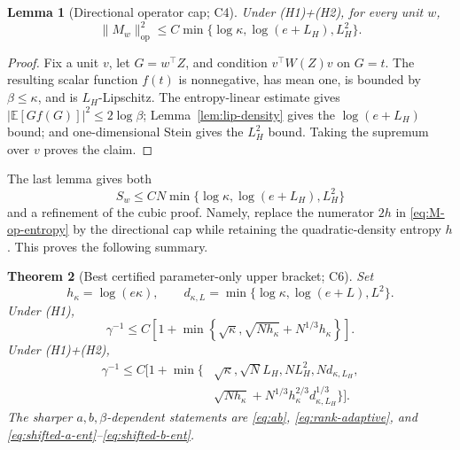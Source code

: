 \documentclass[11pt]{article}
\numberwithin{equation}{section}
\newtheorem{theorem}{Theorem}[section]
\newtheorem{lemma}[theorem]{Lemma}
\newcommand{\E}{\mathbb E}
\newcommand{\op}{\mathrm{op}}
\begin{document}
\begin{lemma}[Directional operator cap; C4]\label{lem:directional-cap}
Under (H1)+(H2), for every unit $w$,
\begin{equation}\label{eq:directional-cap}
 \|M_w\|_{\op}^2\le
 C\min\{\log\kappa,\log(e+L_H),L_H^2\}.
\end{equation}
\end{lemma}

\begin{proof}
Fix a unit $v$, let $G=w^\top Z$, and condition
$v^\top W(Z)v$ on $G=t$.  The resulting scalar function $f(t)$ is
nonnegative, has mean one, is bounded by $\beta\le\kappa$, and is
$L_H$-Lipschitz.  The entropy-linear estimate gives
$|\E[Gf(G)]|^2\le2\log\beta$; Lemma~\ref{lem:lip-density} gives the
$\log(e+L_H)$ bound; and one-dimensional Stein gives the $L_H^2$ bound.
Taking the supremum over $v$ proves the claim.
\end{proof}

The last lemma gives both
\begin{equation}\label{eq:rank-cap}
 S_w\le CN\min\{\log\kappa,\log(e+L_H),L_H^2\}
\end{equation}
and a refinement of the cubic proof.  Namely, replace the numerator
$2h$ in \eqref{eq:M-op-entropy} by the directional cap while retaining the
quadratic-density entropy $h$.  This proves the following summary.

\begin{theorem}[Best certified parameter-only upper bracket; C6]
\label{thm:main-upper}
Set
\begin{equation}\label{eq:h-d0}
 h_\kappa=\log(e\kappa),\qquad
 d_{\kappa,L}=\min\{\log\kappa,\log(e+L),L^2\}.
\end{equation}
Under (H1),
\begin{equation}\label{eq:H1-main-upper}
 \boxed{
 \gamma^{-1}\le C\left[1+\min\left\{\sqrt\kappa,
 \sqrt{Nh_\kappa}+N^{1/3}h_\kappa\right\}\right].}
\end{equation}
Under (H1)+(H2),
\begin{equation}\label{eq:H2-main-upper}
 \boxed{
 \begin{aligned}
 \gamma^{-1}\le C\Big[1+\min\{&\sqrt\kappa,\sqrt N L_H,NL_H^2,
 Nd_{\kappa,L_H},\\
 &\sqrt{Nh_\kappa}
 +N^{1/3}h_\kappa^{2/3}d_{\kappa,L_H}^{1/3}\}\Big].
 \end{aligned}}
\end{equation}
The sharper $a,b,\beta$-dependent statements are
\eqref{eq:ab}, \eqref{eq:rank-adaptive}, and
\eqref{eq:shifted-a-ent}--\eqref{eq:shifted-b-ent}.
\end{theorem}
\end{document}
